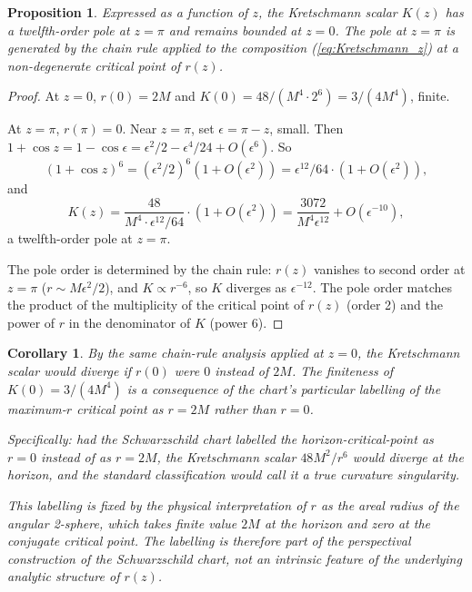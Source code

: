 \documentclass[11pt,a4paper]{article}
\newtheorem{proposition}[theorem]{Proposition}
\newtheorem{corollary}[theorem]{Corollary}
\theoremstyle{definition}
\begin{document}
\begin{proposition}\label{prop:Kretschmann}
Expressed as a function of $z$, the Kretschmann scalar $K(z)$ has a twelfth-order pole at $z = \pi$ and remains bounded at $z = 0$. The pole at $z = \pi$ is generated by the chain rule applied to the composition (\ref{eq:Kretschmann_z}) at a non-degenerate critical point of $r(z)$.
\end{proposition}

\begin{proof}
At $z = 0$, $r(0) = 2M$ and $K(0) = 48/(M^4 \cdot 2^6) = 3/(4M^4)$, finite.

At $z = \pi$, $r(\pi) = 0$. Near $z = \pi$, set $\epsilon = \pi - z$, small. Then $1 + \cos z = 1 - \cos\epsilon = \epsilon^2/2 - \epsilon^4/24 + O(\epsilon^6)$. So
\begin{equation}
(1+\cos z)^6 = (\epsilon^2/2)^6 (1 + O(\epsilon^2)) = \epsilon^{12}/64 \cdot (1 + O(\epsilon^2)),
\end{equation}
and
\begin{equation}
K(z) = \frac{48}{M^4 \cdot \epsilon^{12}/64} \cdot (1 + O(\epsilon^2)) = \frac{3072}{M^4 \epsilon^{12}} + O(\epsilon^{-10}),
\end{equation}
a twelfth-order pole at $z = \pi$.

The pole order is determined by the chain rule: $r(z)$ vanishes to second order at $z = \pi$ ($r \sim M\epsilon^2/2$), and $K \propto r^{-6}$, so $K$ diverges as $\epsilon^{-12}$. The pole order matches the product of the multiplicity of the critical point of $r(z)$ (order 2) and the power of $r$ in the denominator of $K$ (power 6).
\end{proof}

\begin{corollary}\label{cor:Kretschmann_at_z0}
By the same chain-rule analysis applied at $z = 0$, the Kretschmann scalar would diverge if $r(0)$ were $0$ instead of $2M$. The finiteness of $K(0) = 3/(4M^4)$ is a consequence of the chart's particular labelling of the maximum-$r$ critical point as $r = 2M$ rather than $r = 0$.

Specifically: had the Schwarzschild chart labelled the horizon-critical-point as $r = 0$ instead of as $r = 2M$, the Kretschmann scalar $48M^2/r^6$ would diverge at the horizon, and the standard classification would call it a true curvature singularity.

This labelling is fixed by the physical interpretation of $r$ as the areal radius of the angular 2-sphere, which takes finite value $2M$ at the horizon and zero at the conjugate critical point. The labelling is therefore part of the perspectival construction of the Schwarzschild chart, not an intrinsic feature of the underlying analytic structure of $r(z)$.
\end{corollary}
\end{document}
